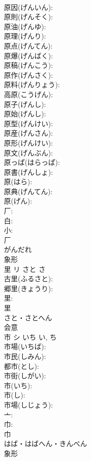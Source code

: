 \documentclass[8pt]{extreport}
\begin{document}
\begin{CJK}{UTF8}{min}
\\	原因(げんいん): 
\\	原則(げんそく): 
\\	原油(げんゆ): 
\\	原理(げんり): 
\\	原点(げんてん): 
\\	原爆(げんばく): 
\\	原稿(げんこう): 
\\	原作(げんさく): 
\\	原料(げんりょう): 
\\	高原(こうげん): 
\\	原子(げんし): 
\\	原始(げんし): 
\\	原型(げんけい): 
\\	原産(げんさん): 
\\	原形(げんけい): 
\\	原文(げんぶん): 
\\	原っぱ(はらっぱ): 
\\	原書(げんしょ): 
\\	原(はら): 
\\	原典(げんてん): 
\\	原(げん): 
\\	厂: 
\\	白: 
\\	小: 
\\	厂	
\\	がんだれ	
\\	象形 
\\	里	リ	さと	さ	
\\	古里(ふるさと): 
\\	郷里(きょうり): 
\\	里: 
\\	里	
\\	さと・さとへん	
\\	会意 
\\	市	シ	いち	い, ち	
\\	市場(いちば): 
\\	市民(しみん): 
\\	都市(とし): 
\\	市街(しがい): 
\\	市(いち): 
\\	市(し): 
\\	市場(しじょう): 
\\	亠: 
\\	巾: 
\\	巾	
\\	はば・はばへん・きんべん	
\\	象形 

\end{CJK}
\end{document}

